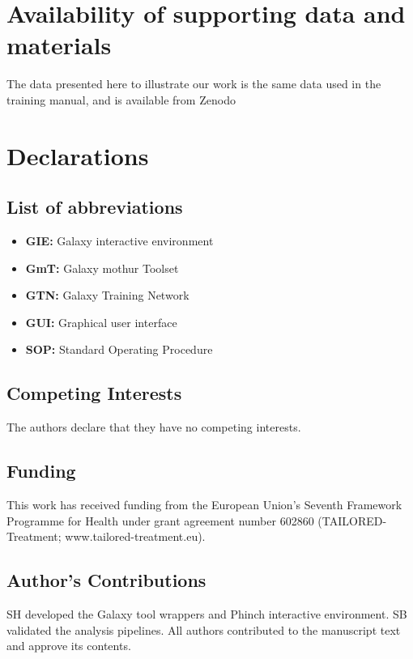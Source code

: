 \section*{Availability of supporting data and materials}

The data presented here to illustrate our work is the same data used in the training manual, and is available from Zenodo~\cite{zenodo-data}

\section*{Declarations}

\subsection*{List of abbreviations}

\begin{itemize}
\item \textbf{GIE:} Galaxy interactive environment
\item \textbf{GmT:} Galaxy mothur Toolset
\item \textbf{GTN:} Galaxy Training Network
\item \textbf{GUI:} Graphical user interface
\item \textbf{SOP:} Standard Operating Procedure
\end{itemize}

\subsection*{Competing Interests}
The authors declare that they have no competing interests.

\subsection*{Funding}
This work has received funding from the European Union’s Seventh Framework Programme for Health under grant agreement number 602860 (TAILORED-Treatment; www.tailored-treatment.eu).

\subsection*{Author's Contributions}

SH developed the Galaxy tool wrappers and Phinch interactive environment. SB validated the analysis pipelines. All authors contributed to the manuscript text and approve its contents.

